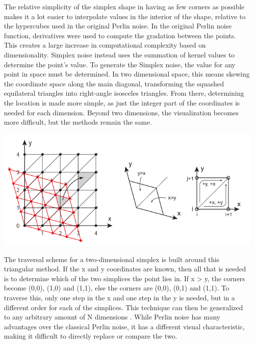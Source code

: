 \documentclass[10pt]{report}
\begin{document}
		The relative simplicity of the simplex shape in having as few corners as possible makes it a lot easier to interpolate values in the interior of the shape, relative to the hypercubes used in the original Perlin noise.
		In the original Perlin noise function, derivatives were used to compute the gradation between the points. This creates a large increase in computational complexity based on dimensionality. Simplex noise instead uses the summation of kernel values to determine the point's value. To generate the Simplex noise, the value for any point in space must be determined. In two dimensional space, this means skewing the coordinate space along the main diagonal, transforming the squashed equilateral triangles into right-angle isosceles triangles. From there, determining the location is made more simple, as just the integer part of the coordinates is needed for each dimension. Beyond two dimensions, the visualization becomes more difficult, but the methods remain the same.  
		
		\begin{minipage}{\textwidth}
			\centering
			\includegraphics[scale=.5]{skewed grid}
			\label{fig:fig9}
		\end{minipage}
		
		The traversal scheme for a two-dimensional simplex is built around this triangular method. If the x and y coordinates are known, then all that is needed is to determine which of the two simplices the point lies in. If x > y, the corners become (0,0), (1,0) and (1,1), else the corners are (0,0), (0,1) and (1,1). To traverse this, only one step in the x and one step in the y is needed, but in a different order for each of the simplices. This technique can then be generalized to any arbitrary amount of N dimensions \cite{simplex-demyst}. While Perlin noise has many advantages over the classical Perlin noise, it has a different visual characteristic, making it difficult to directly replace or compare the two. 
		
\end{document}
